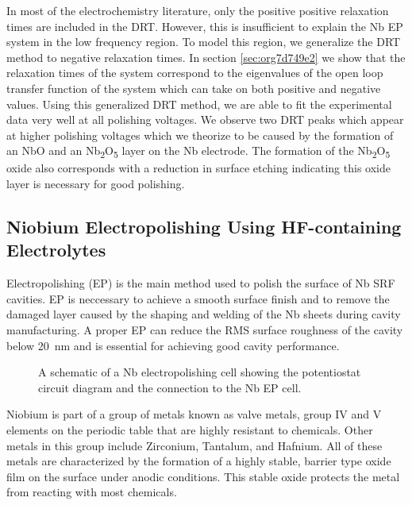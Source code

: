 In most of the electrochemistry literature, only the positive positive relaxation times are included in the DRT. However, this is insufficient to explain the Nb EP system in the low frequency region. To model this region, we generalize the DRT method to negative relaxation times. In section \ref{sec:org7d749e2} we show that the relaxation times of the system correspond to the eigenvalues of the open loop transfer function of the system which can take on both positive and negative values. Using this generalized DRT method, we are able to fit the experimental data very well at all polishing voltages. We observe two DRT peaks which appear at higher polishing voltages which we theorize to be caused by the formation of an NbO and an Nb\textsubscript{2}O\textsubscript{5} layer on the Nb electrode. The formation of the Nb\textsubscript{2}O\textsubscript{5} oxide also corresponds with a reduction in surface etching indicating this oxide layer is necessary for good polishing.





\subsection{Niobium Electropolishing Using HF-containing Electrolytes}


Electropolishing (EP) is the main method used to polish the surface of Nb SRF cavities. EP is neccessary to achieve a smooth surface finish and to remove the damaged layer caused by the shaping and welding of the Nb sheets during cavity manufacturing. A proper EP can reduce the RMS surface roughness of the cavity below \qty{20}{\nano\meter} and is essential for achieving good cavity performance.

\begin{figure}[htbp]
    \centering
    
    
    \caption{A schematic of a Nb electropolishing cell showing the potentiostat circuit diagram and the connection to the Nb EP cell.}
    \label{fig:EP_diagram}
\end{figure}

Niobium is part of a group of metals known as valve metals, group IV and V elements on the periodic table that are highly resistant to chemicals. Other metals in this group include Zirconium, Tantalum, and Hafnium. All of these metals are characterized by the formation of a highly stable, barrier type oxide film on the surface under anodic conditions. This stable oxide protects the metal from reacting with most chemicals. 


